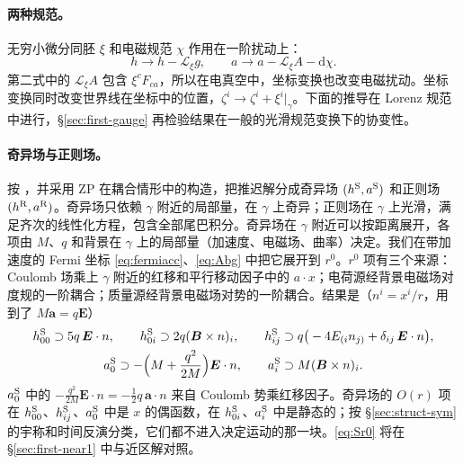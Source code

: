 \documentclass[11pt,a4paper]{ctexart}
\newcommand{\dd}{\mathrm d}
\begin{document}
\paragraph{两种规范。}\label{sec:gauge}无穷小微分同胚 $\xi$ 和电磁规范 $\chi$ 作用在一阶扰动上：
\begin{equation}
h\to h-\mathcal L_\xi g,\qquad a\to a-\mathcal L_\xi A-\dd\chi .
\label{eq:gauge1}
\end{equation}
第二式中的 $\mathcal L_\xi A$ 包含 $\xi^cF_{ca}$，所以在电真空中，坐标变换也改变电磁扰动。坐标变换同时改变世界线在坐标中的位置，$\zeta^i\to\zeta^i+\xi^i|_\gamma$。下面的推导在 Lorenz 规范中进行，\S\ref{sec:first-gauge} 再检验结果在一般的光滑规范变换下的协变性。

\paragraph{奇异场与正则场。}按 \citet{DetweilerWhiting2003}，并采用 ZP 在耦合情形中的构造，把推迟解分成奇异场 $(h^{\rm S},a^{\rm S})$ 和正则场 $(h^{\rm R},a^{\rm R})$。奇异场只依赖 $\gamma$ 附近的局部量，在 $\gamma$ 上奇异；正则场在 $\gamma$ 上光滑，满足齐次的线性化方程，包含全部尾巴积分。奇异场在 $\gamma$ 附近可以按距离展开，各项由 $M$、$q$ 和背景在 $\gamma$ 上的局部量（加速度、电磁场、曲率）决定。我们在带加速度的 Fermi 坐标 \eqref{eq:fermiacc}、\eqref{eq:Abg} 中把它展开到 $r^0$。$r^0$ 项有三个来源：Coulomb 场乘上 $\gamma$ 附近的红移和平行移动因子中的 $a\cdot x$；电荷源经背景电磁场对度规的一阶耦合；质量源经背景电磁场对势的一阶耦合。结果是（$n^i=x^i/r$，用到了 $M\boldsymbol a=q\boldsymbol E$）
\begin{equation}
\begin{gathered}
h^{\rm S}_{00}\supset5q\,\boldsymbol E\cdot n,\qquad
h^{\rm S}_{0i}\supset2q(\boldsymbol B\times n)_i,\qquad
h^{\rm S}_{ij}\supset q\big(-4E_{(i}n_{j)}+\delta_{ij}\,\boldsymbol E\cdot n\big),\\
a^{\rm S}_0\supset-\Big(M+\frac{q^2}{2M}\Big)\boldsymbol E\cdot n,\qquad
a^{\rm S}_i\supset M(\boldsymbol B\times n)_i .
\end{gathered}
\label{eq:Sr0}
\end{equation}
$a^{\rm S}_0$ 中的 $-\tfrac{q^2}{2M}\boldsymbol E\cdot n=-\tfrac12q\,\boldsymbol a\cdot n$ 来自 Coulomb 势乘红移因子。奇异场的 $O(r)$ 项在 $h^{\rm S}_{00}$、$h^{\rm S}_{ij}$、$a^{\rm S}_0$ 中是 $x$ 的偶函数，在 $h^{\rm S}_{0i}$、$a^{\rm S}_i$ 中是静态的；按 \S\ref{sec:struct-sym} 的宇称和时间反演分类，它们都不进入决定运动的那一块。\eqref{eq:Sr0} 将在 \S\ref{sec:first-near1} 中与近区解对照。
\end{document}
